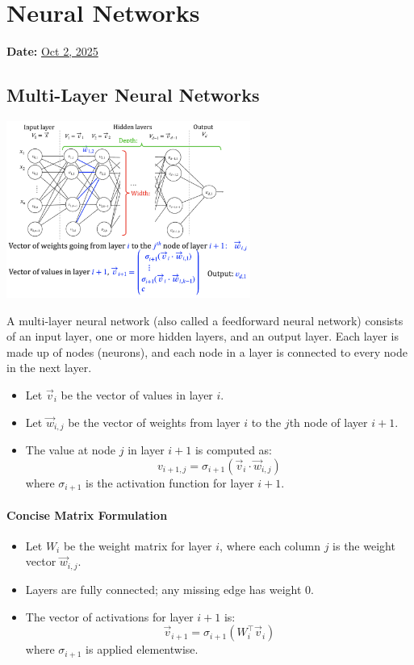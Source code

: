 \section{Neural Networks}
\textbf{Date:} \underline{Oct 2, 2025}

\subsection{Multi-Layer Neural Networks}

\begin{center}
\includegraphics[width=0.6\textwidth]{Images/nn.png}
\end{center}

A multi-layer neural network (also called a feedforward neural network) consists of an input layer, one or more hidden layers, and an output layer. Each layer is made up of nodes (neurons), and each node in a layer is connected to every node in the next layer.
\begin{itemize}
    \item Let $\vec{v}_i$ be the vector of values in layer $i$.
    \item Let $\vec{w}_{i,j}$ be the vector of weights from layer $i$ to the $j$th node of layer $i+1$.
    \item The value at node $j$ in layer $i+1$ is computed as:
    \[
    v_{i+1, j} = \sigma_{i+1}(\vec{v}_i \cdot \vec{w}_{i,j})
    \]
    where $\sigma_{i+1}$ is the activation function for layer $i+1$.
\end{itemize}

\paragraph{Concise Matrix Formulation}

\begin{itemize}
    \item Let $W_i$ be the weight matrix for layer $i$, where each column $j$ is the weight vector $\vec{w}_{i,j}$.
    \item Layers are fully connected; any missing edge has weight $0$.
    \item The vector of activations for layer $i+1$ is:
    \[
    \vec{v}_{i+1} = \sigma_{i+1}(W_i^\top \vec{v}_i)
    \]
    where $\sigma_{i+1}$ is applied elementwise.
\end{itemize}


